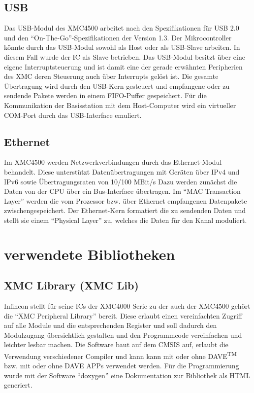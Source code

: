\subsection{USB}
Das \ac{USB}-Modul des XMC4500 arbeitet nach den  Spezifikationen für USB 2.0 und den \enquote{On-The-Go}-Spezifikationen der Version 1.3. Der Mikrocontroller könnte durch das \ac{USB}-Modul sowohl als Host oder als USB-Slave  arbeiten. In diesem Fall wurde der \ac{IC} als Slave betrieben. Das \ac{USB}-Modul besitzt über eine eigene Interruptsteuerung und ist damit eine der gerade erwähnten Peripherien des XMC deren Steuerung auch über Interrupts gelöst ist. Die gesamte Übertragung wird durch den \ac{USB}-Kern gesteuert und empfangene oder zu sendende Pakete werden in einem \ac{FIFO}-Puffer gespeichert. Für die Kommunikation der Basisstation mit dem Host-Computer wird ein virtueller COM-Port durch das \ac{USB}-Interface emuliert.
\subsection{Ethernet} 
Im XMC4500 werden Netzwerkverbindungen durch das  Ethernet-Modul behandelt. Diese unterstützt Datenübertragungen mit Geräten über IPv4 und IPv6 sowie Übertragungsraten von 10/100 MBit/s  Dazu werden zunächst die Daten von der CPU über ein Bus-Interface übertragen. Im \enquote{MAC Transaction Layer} werden die vom Prozessor bzw. über Ethernet empfangenen Datenpakete zwischengespeichert. Der Ethernet-Kern formatiert die zu sendenden Daten und stellt sie einem \enquote{Physical Layer} zu, welches die Daten für den Kanal moduliert.
\section{verwendete Bibliotheken}
\subsection{XMC Library (XMC Lib)}
Infineon stellt für seine \acp{IC} der XMC4000 Serie zu der auch der XMC4500 gehört die \enquote{XMC Peripheral Library} bereit. Diese erlaubt einen vereinfachten Zugriff auf alle Module und die entsprechenden Register und soll dadurch den Modulzugang übersichtlich gestalten und den Programmcode vereinfachen und leichter lesbar machen. Die Software baut auf dem \ac{CMSIS} auf, erlaubt die Verwendung verschiedener Compiler und kann kann mit oder ohne DAVE\textsuperscript{TM} bzw. mit oder ohne DAVE APPs verwendet werden. %
Für die Programmierung wurde mit der Software \enquote{doxygen} eine Dokumentation zur Bibliothek als HTML generiert.

